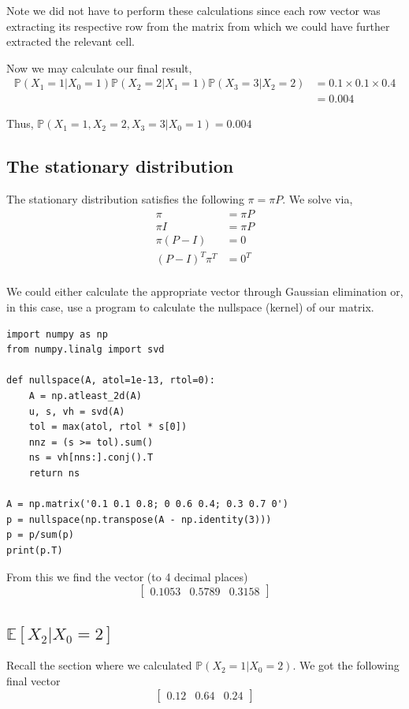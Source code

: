 \documentclass{article}
\newcommand{\prob}{\mathbb{P}}
\newcommand{\expect}{\mathbb{E}}
\begin{document}
Note we did not have to perform these calculations since each row vector
was extracting its respective row from the matrix from which we could have
further extracted the relevant cell.

Now we may calculate our final result,
\begin{align*}
    \prob(X_1 = 1 | X_0 = 1) \prob(X_2 = 2 | X_1 = 1) \prob(X_3 = 3 | X_2 = 2)
    &= 0.1 \times 0.1 \times 0.4 \\
    &= 0.004
\end{align*}

Thus, $\prob(X_1 = 1, X_2 = 2, X_3 = 3 | X_0 = 1) = 0.004$

\subsection{The stationary distribution}
The stationary distribution satisfies the following $\pi = \pi P$.
We solve via,
\begin{align*}
    \pi &= \pi P \\
    \pi I &= \pi P \\
    \pi (P - I) &= 0 \\
    (P - I)^T \pi^T &= 0^T \\
\end{align*}

We could either calculate the appropriate vector through Gaussian elimination
or, in this case, use a program to calculate the nullspace (kernel) of our
matrix.
\begin{verbatim}
import numpy as np
from numpy.linalg import svd

def nullspace(A, atol=1e-13, rtol=0):
    A = np.atleast_2d(A)
    u, s, vh = svd(A)
    tol = max(atol, rtol * s[0])
    nnz = (s >= tol).sum()
    ns = vh[nns:].conj().T
    return ns

A = np.matrix('0.1 0.1 0.8; 0 0.6 0.4; 0.3 0.7 0')
p = nullspace(np.transpose(A - np.identity(3)))
p = p/sum(p)
print(p.T)
\end{verbatim}

From this we find the vector (to 4 decimal places)
\[
    \begin{bmatrix}
        0.1053 & 0.5789 & 0.3158
    \end{bmatrix}
\]

\subsection{$\expect[X_2 | X_0 = 2]$}
Recall the section where we calculated $\prob(X_2 = 1 | X_0 = 2)$.
We got the following final vector
\[
    \begin{bmatrix}
        0.12 & 0.64 & 0.24
    \end{bmatrix}
\]
\end{document}
